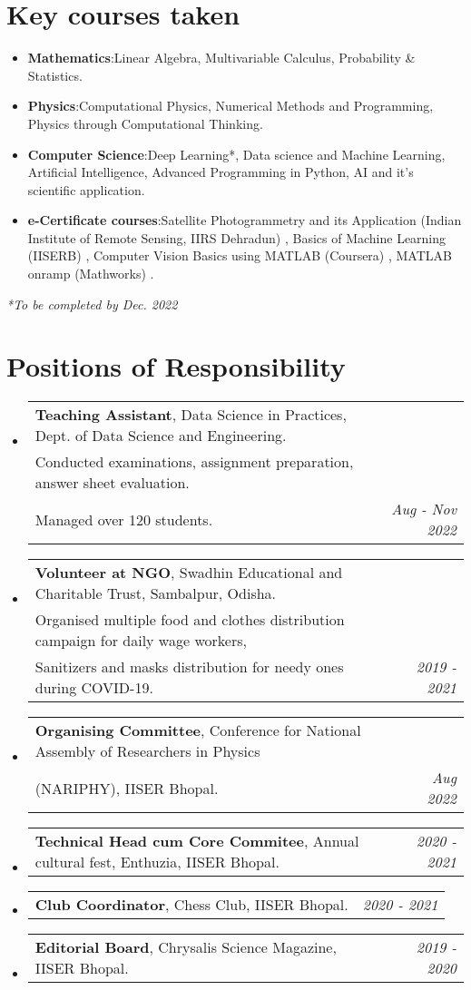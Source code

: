 \documentclass[a4paper,11pt]{article}
\makeatletter
\newcommand{\resumeItem}[2]{
  \item{
    \textbf{#1}{:\hspace{0.5mm}#2 \vspace{-0.5mm}}
  }
}
\newcommand{\resumePOR}[3]{
\vspace{0.5mm}\item
    \begin{tabular*}{0.97\textwidth}[t]{l@{\extracolsep{\fill}}r}
        \textbf{#1}, \hspace{0.3mm}#2 & \textit{\small{#3}} 
    \end{tabular*}
    \vspace{-2mm}
}
\newcommand{\resumeSubItem}[2]{\resumeItem{#1}{#2}\vspace{-4pt}}
\newcommand{\resumeSubHeadingListStart}{\begin{itemize}[leftmargin=*,labelsep=0mm]}
\newcommand{\resumeHeadingSkillStart}{\begin{itemize}[leftmargin=*,itemsep=1.7mm, rightmargin=2ex]}
\newcommand{\resumeSubHeadingListEnd}{\end{itemize}\vspace{2mm}}
\newcommand{\resumeHeadingSkillEnd}{\end{itemize}\vspace{-2mm}}
\makeatother
\begin{document}
\section{Key courses taken}
\resumeHeadingSkillStart
\resumeSubItem{Mathematics} %
    {Linear Algebra, Multivariable Calculus, Probability \& Statistics.}
\resumeSubItem{Physics} %
    {Computational Physics, Numerical Methods and Programming, Physics through Computational Thinking.}
\resumeSubItem{Computer Science} %
    {Deep Learning*, Data science and Machine Learning, Artificial Intelligence, Advanced Programming in Python, AI and it's scientific application.}
\resumeSubItem{e-Certificate courses} %
    {Satellite Photogrammetry and its Application (Indian Institute of Remote Sensing, IIRS Dehradun) \href{https://drive.google.com/file/d/1Va-hpY1TD7TdQ1_NzGwa9ggJ51vc5G4F/view?usp=share_link}{\footnotesize  \faIcon{link}}, Basics of Machine Learning (IISERB) \href{https://drive.google.com/file/d/1BFrfINnnO-heBwsiXnqa4u2_QSWYoIO0/view?usp=share_link}{\footnotesize  \faIcon{link}}, Computer Vision Basics using MATLAB (Coursera) \href{https://drive.google.com/file/d/1puteJJLp2zHHtByPVuY3wXHVIiDmp87M/view?usp=sharing}{\footnotesize \faIcon{link}}, MATLAB onramp (Mathworks) \href{https://drive.google.com/file/d/1-HQdhUhWTQ7qmyNNIMeb9y5ejI7DH3Uc/view?usp=share_link}{\footnotesize  \faIcon{link}}.}
\resumeHeadingSkillEnd
\hfill \textit{\footnotesize{*To be completed by Dec. 2022}}

\section{Positions of Responsibility}
\vspace{-0.4mm}
\resumeSubHeadingListStart
\resumePOR{Teaching Assistant} %
    {Data Science in Practices, Dept. of Data Science and Engineering. \\
    Conducted examinations, assignment preparation, answer sheet evaluation. \\ Managed over 120 students.} %
    {Aug - Nov 2022} %
\resumePOR{Volunteer at NGO} %
    {Swadhin Educational and Charitable Trust, Sambalpur, Odisha. \\
    Organised multiple food and clothes distribution campaign for daily wage workers,\\
    Sanitizers and masks distribution for needy ones during COVID-19.} %
    {2019 - 2021} %
\resumePOR{Organising Committee} %
    {Conference for National Assembly of Researchers in Physics \\(NARIPHY), IISER Bhopal.} %
    {Aug 2022} %
\resumePOR{Technical Head cum Core Commitee} %
    {Annual cultural fest, Enthuzia, IISER Bhopal.} %
    {2020 - 2021} %
\resumePOR{Club Coordinator} %
    {Chess Club, IISER Bhopal.} %
    {2020 - 2021} %
\resumePOR{Editorial Board} %
    {Chrysalis Science Magazine, IISER Bhopal.} %
    {2019 - 2020} %
\resumeSubHeadingListEnd
\vspace{-4mm}
\end{document}
